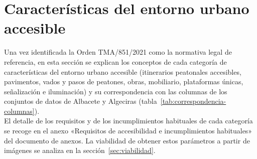 \section{Características del entorno urbano accesible}
\label{sec:caracteristicas}

Una vez identificada la Orden TMA/851/2021 como la normativa legal de referencia, en esta sección se explican los conceptos de cada categoría de características del entorno urbano accesible (itinerarios peatonales accesibles, pavimentos, vados y pasos de peatones, obras, mobiliario, plataformas únicas, señalización e iluminación) y su correspondencia con las columnas de los conjuntos de datos de Albacete y Algeciras (tabla~\ref{tab:correspondencia-columnas}).
\\

El detalle de los requisitos y de los incumplimientos habituales de cada categoría se recoge en el anexo «Requisitos de accesibilidad e incumplimientos habituales» del documento de anexos. La viabilidad de obtener estos parámetros a partir de imágenes se analiza en la sección~\ref{sec:viabilidad}.
\\

